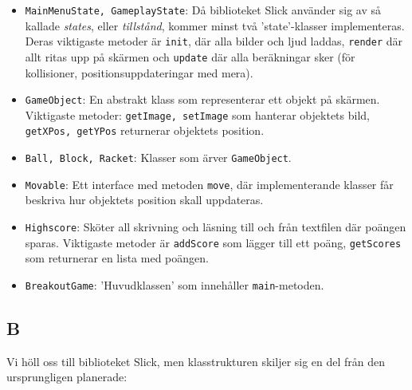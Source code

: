 \documentclass[11pt,a4paper]{article}
\begin{document}
\begin{itemize}
	\item \texttt{MainMenuState, GameplayState}: Då biblioteket Slick använder sig av så kallade \emph{states}, eller \emph{tillstånd}, kommer minst två 'state'-klasser implementeras. Deras viktigaste metoder är \texttt{init}, där alla bilder och ljud laddas, \texttt{render} där allt ritas upp på skärmen och \texttt{update} där alla beräkningar sker (för kollisioner, positionsuppdateringar med mera).
	\item \texttt{GameObject}: En abstrakt klass som representerar ett objekt på skärmen. Viktigaste metoder: \texttt{getImage, setImage} som hanterar objektets bild, \texttt{getXPos, getYPos} returnerar objektets position.
	\item \texttt{Ball, Block, Racket}: Klasser som ärver \texttt{GameObject}.
	\item \texttt{Movable}: Ett interface med metoden \texttt{move}, där implementerande klasser får beskriva hur objektets position skall uppdateras.
	\item \texttt{Highscore}: Sköter all skrivning och läsning till och från textfilen där poängen sparas. Viktigaste metoder är \texttt{addScore} som lägger till ett poäng, \texttt{getScores} som returnerar en lista med poängen.
	\item \texttt{BreakoutGame}: 'Huvudklassen' som innehåller \texttt{main}-metoden.
\end{itemize}

\subsection{B}
Vi höll oss till biblioteket Slick, men klasstrukturen skiljer sig en del från den ursprungligen planerade:
\end{document}
